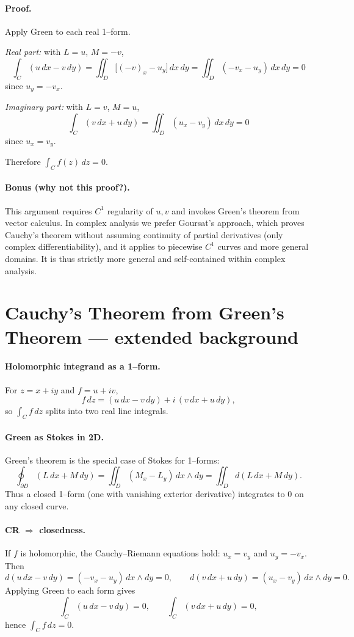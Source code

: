 \documentclass[11pt]{article}
\begin{document}
\paragraph{Proof.}
Apply Green to each real 1--form.

\emph{Real part:} with $L=u$, $M=-v$,
\[
\int_C (u\,dx-v\,dy)=\iint_D\big[(-v)_x-u_y\big]\,dx\,dy
=\iint_D (-v_x-u_y)\,dx\,dy=0
\]
since $u_y=-v_x$.

\emph{Imaginary part:} with $L=v$, $M=u$,
\[
\int_C (v\,dx+u\,dy)=\iint_D (u_x-v_y)\,dx\,dy=0
\]
since $u_x=v_y$.

Therefore $\displaystyle \int_C f(z)\,dz=0$.

\paragraph{Bonus (why not this proof?).}
This argument requires $C^1$ regularity of $u,v$ and invokes Green’s theorem from vector calculus.
In complex analysis we prefer Goursat’s approach, which proves Cauchy’s theorem without assuming
continuity of partial derivatives (only complex differentiability), and it applies to piecewise
$C^1$ curves and more general domains. It is thus strictly more general and self-contained within
complex analysis.

\section*{Cauchy’s Theorem from Green’s Theorem — extended background}

\paragraph{Holomorphic integrand as a 1--form.}
For $z=x+iy$ and $f=u+iv$,
\[
f\,dz=(u\,dx-v\,dy)+i\,(v\,dx+u\,dy),
\]
so $\displaystyle \int_C f\,dz$ splits into two real line integrals.

\paragraph{Green as Stokes in 2D.}
Green’s theorem is the special case of Stokes for 1--forms:
\[
\oint_{\partial D}(L\,dx+M\,dy)=\iint_D (M_x-L_y)\,dx\wedge dy
=\iint_D d(L\,dx+M\,dy).
\]
Thus a closed 1--form (one with vanishing exterior derivative) integrates to $0$ on any closed curve.

\paragraph{CR $\Rightarrow$ closedness.}
If $f$ is holomorphic, the Cauchy--Riemann equations hold:
$u_x=v_y$ and $u_y=-v_x$. Then
\[
d(u\,dx-v\,dy)=(-v_x-u_y)\,dx\wedge dy=0,
\qquad
d(v\,dx+u\,dy)=(u_x-v_y)\,dx\wedge dy=0.
\]
Applying Green to each form gives
\[
\int_C (u\,dx-v\,dy)=0,
\qquad
\int_C (v\,dx+u\,dy)=0,
\]
hence $\displaystyle \int_C f\,dz=0$.
\end{document}

